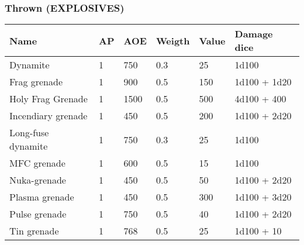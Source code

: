 
\subsubsection{Thrown (EXPLOSIVES)}
\begin{longtable}{|p{4cm}|p{1.1cm}|p{3cm}|p{3cm}|p{2cm}|p{4cm}|}
\hline
\bfseries Name & \bfseries AP & \bfseries AOE & \bfseries Weigth & \bfseries Value & \bfseries Damage dice \\
\hline
\endhead
Dynamite & 1 & 750 & 0.3 & 25 & 1d100 \\
Frag grenade & 1 & 900 & 0.5 & 150 & 1d100 + 1d20 \\
Holy Frag Grenade & 1 & 1500 & 0.5 & 500 & 4d100 + 400 \\
Incendiary grenade & 1 & 450 & 0.5 & 200 & 1d100 + 2d20 \\
Long-fuse dynamite & 1 & 750 & 0.3 & 25 & 1d100 \\
MFC grenade & 1 & 600 & 0.5 & 15 & 1d100 \\
Nuka-grenade & 1 & 450 & 0.5 & 50 & 1d100 + 2d20 \\
Plasma grenade & 1 & 450 & 0.5 & 300 & 1d100 + 3d20 \\
Pulse grenade & 1 & 750 & 0.5 & 40 & 1d100 + 2d20 \\
Tin grenade & 1 & 768 & 0.5 & 25 & 1d100 + 10 \\
\hline
\end{longtable}
